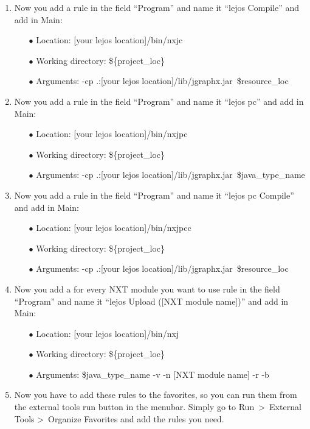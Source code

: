 \documentclass[%
  a4paper,%
  11pt,%
  blue,%
  hyperref	%
  ]{tubsartcl}
\begin{document}
\begin{enumerate}
	\item Now you add a rule in the field ``Program'' and name it ``lejos Compile'' and add in Main:
	\begin{enumerate}
	\item[$\bullet$] Location: [your lejos location]/bin/nxjc
	\item[$\bullet$] Working directory: \$\{project\_loc\}
	\item[$\bullet$] Arguments: -cp \textquotedbl .:[your lejos location]/lib/jgraphx.jar\textquotedbl\ \${resource\_loc}
	\end{enumerate}
	\item Now you add a rule in the field ``Program'' and name it ``lejos pc'' and add in Main:
	\begin{enumerate}
	\item[$\bullet$] Location: [your lejos location]/bin/nxjpc
	\item[$\bullet$] Working directory: \$\{project\_loc\}
	\item[$\bullet$] Arguments: -cp \textquotedbl .:[your lejos location]/lib/jgraphx.jar\textquotedbl\ \${java\_type\_name}
	\end{enumerate}
	\item Now you add a rule in the field ``Program'' and name it ``lejos pc Compile'' and add in Main:
	\begin{enumerate}
	\item[$\bullet$] Location: [your lejos location]/bin/nxjpcc
	\item[$\bullet$] Working directory: \$\{project\_loc\}
	\item[$\bullet$] Arguments: -cp \textquotedbl .:[your lejos location]/lib/jgraphx.jar\textquotedbl\ \${resource\_loc}
	\end{enumerate}
	\item Now you add a for every NXT module you want to use rule in the field ``Program'' and name it ``lejos Upload ([NXT module name])'' and add in Main:
	\begin{enumerate}
	\item[$\bullet$] Location: [your lejos location]/bin/nxj
	\item[$\bullet$] Working directory: \$\{project\_loc\}
	\item[$\bullet$] Arguments: \${java\_type\_name} -v -n [NXT module name] -r -b
	\end{enumerate}
	\item Now you have to add these rules to the favorites, so you can run them from the external tools run button in the menubar. Simply go to Run\ \textgreater\ External Tools \textgreater\ Organize Favorites and add the rules you need.
\end{enumerate}
\end{document}
